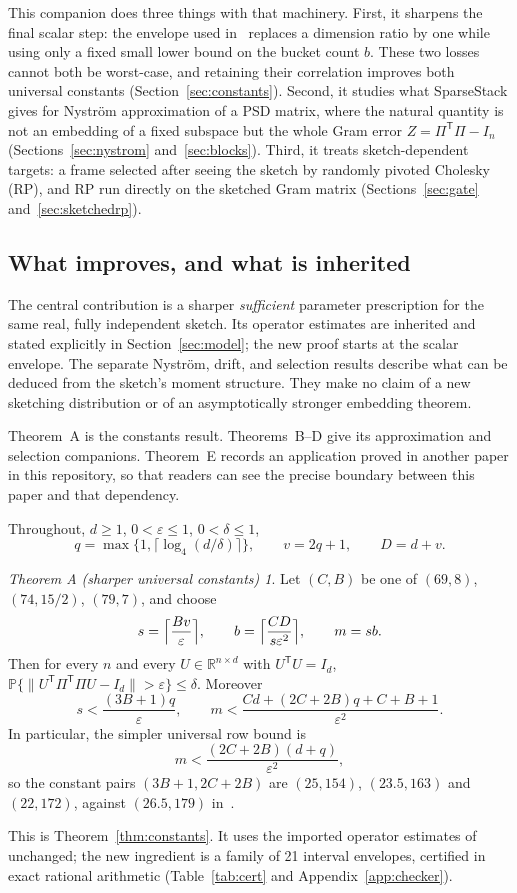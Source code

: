 \documentclass[11pt,a4paper]{article}
\theoremstyle{definition}
\theoremstyle{remark}
\newtheorem*{mainA}{Theorem A (sharper universal constants)}
\newcommand{\Prob}{\mathbb P}
\newcommand{\R}{\mathbb R}
\newcommand{\eps}{\varepsilon}
\newcommand{\norm}[1]{\lVert#1\rVert}
\newcommand{\1}{\mathbf 1}
\newcommand{\T}{\mathsf T}
\begin{document}
This companion does three things with that machinery. First, it
sharpens the final scalar step: the envelope used in~\cite{SS} replaces a
dimension ratio by one while using only a fixed small lower bound on the
bucket count $b$. These two losses cannot both be worst-case, and
retaining their correlation improves both universal constants
(Section~\ref{sec:constants}). Second, it studies what SparseStack gives
for Nystr\"om approximation of a PSD matrix, where the natural quantity
is not an embedding of a fixed subspace but the whole Gram error
$Z=\Pi^\T\Pi-I_n$ (Sections~\ref{sec:nystrom} and~\ref{sec:blocks}).
Third, it treats sketch-dependent targets: a frame selected after seeing
the sketch by randomly pivoted Cholesky (RP), and RP run directly on the
sketched Gram matrix (Sections~\ref{sec:gate} and~\ref{sec:sketchedrp}).

\subsection{What improves, and what is inherited}\label{sec:main-results}
The central contribution is a sharper \emph{sufficient} parameter
prescription for the same real, fully independent sketch. Its operator
estimates are inherited and stated explicitly in Section~\ref{sec:model};
the new proof starts at the scalar envelope. The separate Nystr\"om,
drift, and selection results describe what can be deduced from the
sketch's moment structure. They make no claim of a new sketching
distribution or of an asymptotically stronger embedding theorem.

Theorem~A is the constants result. Theorems~B--D give its approximation
and selection companions. Theorem~E records an application proved in
another paper in this repository, so that readers can see the precise
boundary between this paper and that dependency.

Throughout, $d\ge1$, $0<\eps\le1$, $0<\delta\le1$,
\[
 q=\max\{1,\lceil\log_4(d/\delta)\rceil\},\qquad v=2q+1,\qquad D=d+v.
\]

\begin{mainA}
Let $(C,B)$ be one of $(69,8)$, $(74,15/2)$, $(79,7)$, and choose
\[
 s=\Bigl\lceil\frac{Bv}{\eps}\Bigr\rceil,\qquad
 b=\Bigl\lceil\frac{CD}{s\eps^2}\Bigr\rceil,\qquad m=sb.
\]
Then for every $n$ and every $U\in\R^{n\times d}$ with $U^\T U=I_d$,
$\Prob\{\norm{U^\T\Pi^\T\Pi U-I_d}>\eps\}\le\delta$. Moreover
\[
 s<\frac{(3B+1)q}{\eps},\qquad
 m<\frac{Cd+(2C+2B)q+C+B+1}{\eps^2}.
\]
In particular, the simpler universal row bound is
\[
 m<\frac{(2C+2B)(d+q)}{\eps^2},
\]
so the constant pairs $(3B+1,2C+2B)$ are $(25,154)$, $(23.5,163)$ and
$(22,172)$, against $(26.5,179)$ in~\cite{SS}.
\end{mainA}
This is Theorem~\ref{thm:constants}. It uses the imported operator
estimates of~\cite{SS} unchanged; the new ingredient is a family of 21
interval envelopes, certified in exact rational arithmetic
(Table~\ref{tab:cert} and Appendix~\ref{app:checker}).
\end{document}
